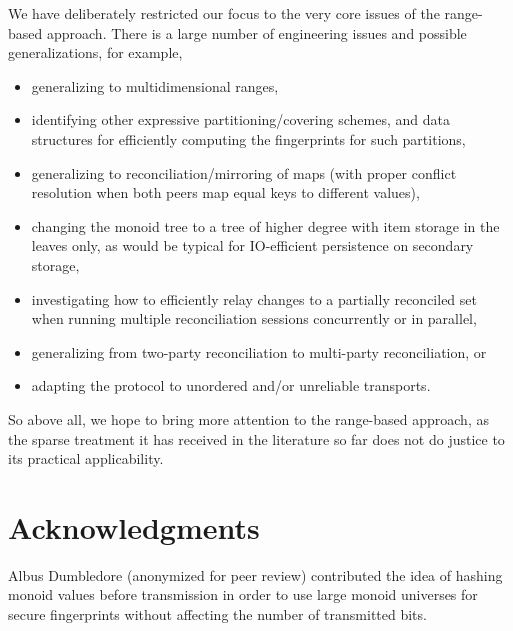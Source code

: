 \documentclass[conference]{IEEEtran}
\begin{document}
We have deliberately restricted our focus to the very core issues of the range-based approach. There is a large number of engineering issues and possible generalizations, for example,

\begin{itemize}
	\item generalizing to multidimensional ranges,
	\item identifying other expressive partitioning/covering schemes, and data structures for efficiently computing the fingerprints for such partitions,
	\item generalizing to reconciliation/mirroring of maps (with proper conflict resolution when both peers map equal keys to different values),
	\item changing the monoid tree to a tree of higher degree with item storage in the leaves only, as would be typical for IO-efficient persistence on secondary storage,
	\item investigating how to efficiently relay changes to a partially reconciled set when running multiple reconciliation sessions concurrently or in parallel,
	\item generalizing from two-party reconciliation to multi-party reconciliation, or
	\item adapting the protocol to unordered and/or unreliable transports.
\end{itemize}

So above all, we hope to bring more attention to the range-based approach, as the sparse treatment it has received in the literature so far does not do justice to its practical applicability.

\section{Acknowledgments}

Albus Dumbledore (anonymized for peer review)
 contributed the idea of hashing monoid values before transmission in order to use large monoid universes for secure fingerprints without affecting the number of transmitted bits.



\end{document}
